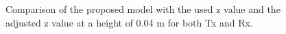 




 \begin{figure}[H]
\centering

\caption{Comparison of the proposed model with the used z value and the adjusted z value at a height of 0.04 m for both Tx and Rx.}
\label{Modelzadjust}
\end{figure}    
